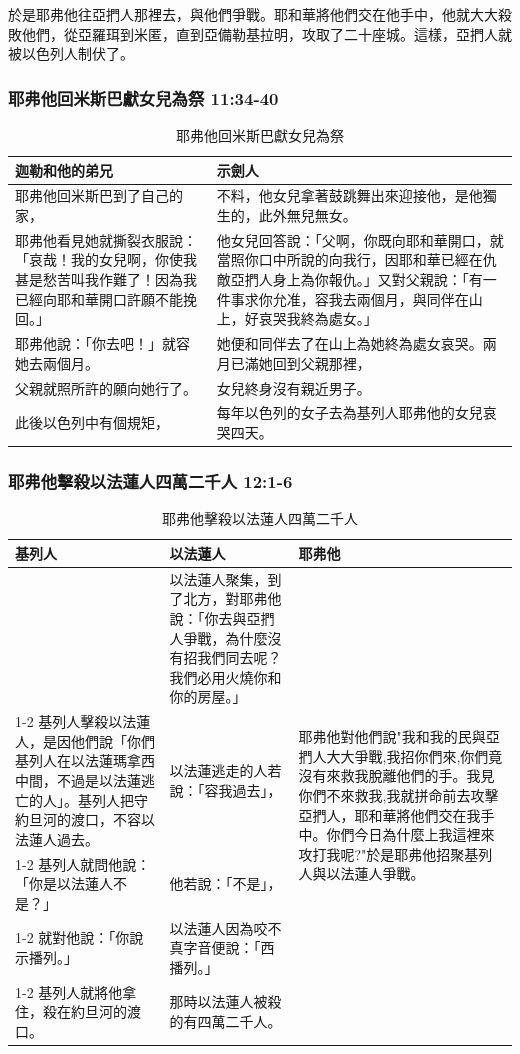 於是耶弗他往亞捫人那裡去，與他們爭戰。耶和華將他們交在他手中，他就大大殺敗他們，從亞羅珥到米匿，直到亞備勒基拉明，攻取了二十座城。這樣，亞捫人就被以色列人制伏了。

\subsubsection{耶弗他回米斯巴獻女兒為祭 11:34-40}
\begin{table}[H]
\centering
\begin{tabular}{p{6.5cm}|p{10.6cm}}\hline\hline
迦勒和他的弟兄&示劍人\\\hline
耶弗他回米斯巴到了自己的家，
&不料，他女兒拿著鼓跳舞出來迎接他，是他獨生的，此外無兒無女。\\\hline
耶弗他看見她就撕裂衣服說：「哀哉！我的女兒啊，你使我甚是愁苦叫我作難了！因為我已經向耶和華開口許願不能挽回。」&他女兒回答說：「父啊，你既向耶和華開口，就當照你口中所說的向我行，因耶和華已經在仇敵亞捫人身上為你報仇。」又對父親說：「有一件事求你允准，容我去兩個月，與同伴在山上，好哀哭我終為處女。」\\\hline
耶弗他說：「你去吧！」就容她去兩個月。&她便和同伴去了在山上為她終為處女哀哭。兩月已滿她回到父親那裡，\\\hline
父親就照所許的願向她行了。&女兒終身沒有親近男子。\\\hline
此後以色列中有個規矩，&每年以色列的女子去為基列人耶弗他的女兒哀哭四天。\\\hline
 \end{tabular}
\caption{耶弗他回米斯巴獻女兒為祭}
\end{table}  


\subsubsection{耶弗他擊殺以法蓮人四萬二千人 12:1-6} 
\begin{table}[H]
\centering
\begin{tabular}{p{6.4cm}|p{6.6cm}|p{3.8cm}}\hline
基列人&以法蓮人&耶弗他\\\hline
&以法蓮人聚集，到了北方，對耶弗他說：「你去與亞捫人爭戰，為什麼沒有招我們同去呢？我們必用火燒你和你的房屋。」&\multirow{5}{4cm}{耶弗他對他們說"我和我的民與亞捫人大大爭戰,我招你們來,你們竟沒有來救我脫離他們的手。我見你們不來救我,我就拼命前去攻擊亞捫人，耶和華將他們交在我手中。你們今日為什麼上我這裡來攻打我呢?"於是耶弗他招聚基列人與以法蓮人爭戰。}\\\cline{1-2}
基列人擊殺以法蓮人，是因他們說「你們基列人在以法蓮瑪拿西中間，不過是以法蓮逃亡的人」。基列人把守約旦河的渡口，不容以法蓮人過去。&
以法蓮逃走的人若說：「容我過去」，& \\\cline{1-2}
基列人就問他說：「你是以法蓮人不是？」&
他若說：「不是」，&\\\cline{1-2}
就對他說：「你說示播列。」&
以法蓮人因為咬不真字音便說：「西播列。」&\\\cline{1-2}
基列人就將他拿住，殺在約旦河的渡口。&
那時以法蓮人被殺的有四萬二千人。&\\\hline
 \end{tabular}
\caption{耶弗他擊殺以法蓮人四萬二千人}
\end{table}  


